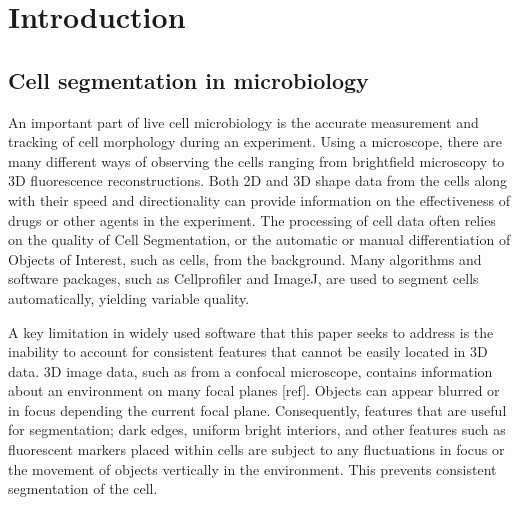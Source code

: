 
\chapter{Introduction}  %

\ifpdf
    \graphicspath{{Chapter1/Figs/Raster/}{Chapter1/Figs/PDF/}{Chapter1/Figs/}}
\else
    \graphicspath{{Chapter1/Figs/Vector/}{Chapter1/Figs/}}
\fi


\section{Cell segmentation in microbiology}

An important part of live cell microbiology is the accurate measurement and tracking of cell morphology during an experiment. Using a microscope, there are many different ways of observing the cells ranging from brightfield microscopy to 3D fluorescence reconstructions. Both 2D and 3D shape data from the cells along with their speed and directionality can provide information on the effectiveness of drugs or other agents in the experiment. The processing of cell data often relies on the quality of Cell Segmentation, or the automatic or manual differentiation of Objects of Interest, such as cells, from the background. Many algorithms and software packages, such as Cellprofiler and ImageJ, are used to segment cells automatically, yielding variable quality.

A key limitation in widely used software that this paper seeks to address is the inability to account for consistent features that cannot be easily located in 3D data. 3D image data, such as from a confocal microscope, contains information about an environment on many focal planes [ref]. Objects can appear blurred or in focus depending the current focal plane. Consequently, features that are useful for segmentation; dark edges, uniform bright interiors, and other features such as fluorescent markers placed within cells are subject to any fluctuations in focus or the movement of objects vertically in the environment. This prevents consistent segmentation of the cell.

